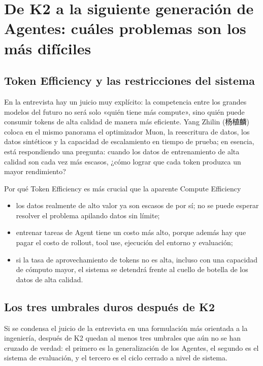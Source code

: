 \section{De K2 a la siguiente generación de Agentes: cuáles problemas son los más difíciles}

\subsection{Token Efficiency y las restricciones del sistema}
En la entrevista hay un juicio muy explícito: la competencia entre los grandes modelos del futuro no será solo «quién tiene más compute», sino quién puede consumir tokens de alta calidad de manera más eficiente. Yang Zhilin (杨植麟) coloca en el mismo panorama el optimizador Muon, la reescritura de datos, los datos sintéticos y la capacidad de escalamiento en tiempo de prueba; en esencia, está respondiendo una pregunta: cuando los datos de entrenamiento de alta calidad son cada vez más escasos, ¿cómo lograr que cada token produzca un mayor rendimiento?

\begin{importantbox}{Por qué Token Efficiency es más crucial que la aparente Compute Efficiency}
\begin{itemize}
    \item los datos realmente de alto valor ya son escasos de por sí; no se puede esperar resolver el problema apilando datos sin límite;
    \item entrenar tareas de Agent tiene un costo más alto, porque además hay que pagar el costo de rollout, tool use, ejecución del entorno y evaluación;
    \item si la tasa de aprovechamiento de tokens no es alta, incluso con una capacidad de cómputo mayor, el sistema se detendrá frente al cuello de botella de los datos de alta calidad.
\end{itemize}
\end{importantbox}

\subsection{Los tres umbrales duros después de K2}
Si se condensa el juicio de la entrevista en una formulación más orientada a la ingeniería, después de K2 quedan al menos tres umbrales que aún no se han cruzado de verdad: el primero es la generalización de los Agentes, el segundo es el sistema de evaluación, y el tercero es el ciclo cerrado a nivel de sistema.

